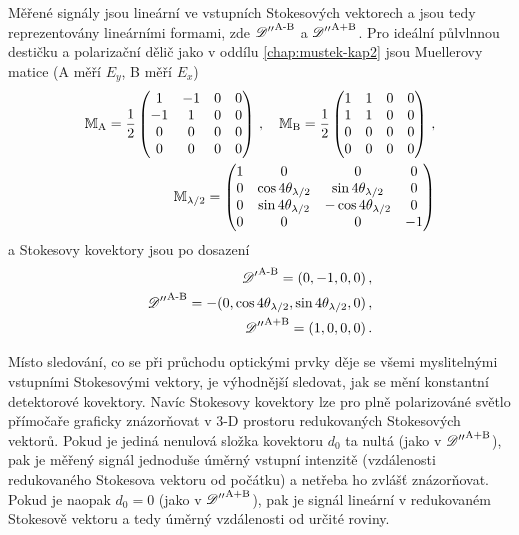 Měřené signály jsou lineární ve vstupních Stokesových vektorech a jsou tedy reprezentovány lineárními formami, zde ${\mathscr{D}''}^\textrm{A-B}$ a ${\mathscr{D}''}^\textrm{A+B}$.
Pro ideální půlvlnnou destičku a polarizační dělič jako v oddílu \ref{chap:mustek-kap2} jsou Muellerovy matice (A měří $E_y$, B měří $E_x$)
\begin{align}
    \mathbb{M}_\textrm{A} = \frac{1}{2}\begin{pmatrix} 1&-1&0&0 \\ -1&1&0&0 \\ 0&0&0&0 \\ 0&0&0&0 \end{pmatrix} \,,\quad 
    \mathbb{M}_\textrm{B} = \frac{1}{2}\begin{pmatrix} 1&1&0&0 \\ 1&1&0&0 \\ 0&0&0&0 \\ 0&0&0&0 \end{pmatrix} \,, \\
    \mathbb{M}_{\lambda/2} = \begin{pmatrix} 1&0&0&0 \\ 0&\cos4\theta_{\lambda/2}&\sin4\theta_{\lambda/2}&0 \\ 0&\sin4\theta_{\lambda/2}&-\cos4\theta_{\lambda/2}&0 \\ 0&0&0&-1 \end{pmatrix}
\end{align}
a Stokesovy kovektory jsou po dosazení
\begin{align}
    {\mathscr{D}'}^\textrm{A-B}=(0, -1, 0, 0) \,, \\
    {\mathscr{D}''}^\textrm{A-B}=-(0, \cos4\theta_{\lambda/2}, \sin4\theta_{\lambda/2}, 0) \,, \label{eqn:Uab-Mueller} \\
    {\mathscr{D}''}^\textrm{A+B}=(1, 0, 0, 0) \,.
\end{align}

Místo sledování, co se při průchodu optickými prvky děje se všemi myslitelnými vstupními Stokesovými vektory, je výhodnější sledovat, jak se mění konstantní detektorové kovektory.
Navíc Stokesovy kovektory lze pro plně polarizováné světlo přímočaře graficky znázorňovat v 3-D prostoru redukovaných Stokesových vektorů.
Pokud je jediná nenulová složka kovektoru $d_0$ ta nultá (jako v ${\mathscr{D}''}^\textrm{A+B}$), pak je měřený signál jednoduše úměrný vstupní intenzitě (vzdálenosti redukovaného Stokesova vektoru od počátku) a netřeba ho zvlášť znázorňovat.
Pokud je naopak $d_0=0$ (jako v ${\mathscr{D}''}^\textrm{A+B}$), pak je signál lineární v redukovaném Stokesově vektoru a tedy úměrný vzdálenosti od určité roviny.

